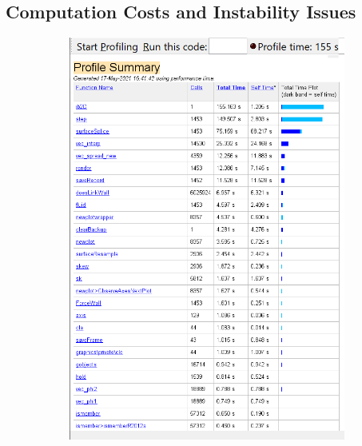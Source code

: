 \documentclass{jfm}
\newcommand{\daniel}[1]{\todo[inline,color=yellow!40]{Daniel: #1}}
\begin{document}

\subsection {Computation Costs and Instability Issues}
    \begin{figure}
        \begin{subfigure}{.5\textwidth}
        \centering
        \includegraphics[width=\textwidth,trim={0mm 0mm 0mm 0mm},clip]{figs/time_profiling/summary.png}
        \end{subfigure}

\end{figure}
\end{document}
